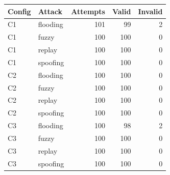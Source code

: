 \begin{tabular}{llrrr}
Config & Attack & Attempts & Valid & Invalid \\ 
\hline
C1 & flooding & 101 & 99 & 2 \\
C1 & fuzzy & 100 & 100 & 0 \\
C1 & replay & 100 & 100 & 0 \\
C1 & spoofing & 100 & 100 & 0 \\
C2 & flooding & 100 & 100 & 0 \\
C2 & fuzzy & 100 & 100 & 0 \\
C2 & replay & 100 & 100 & 0 \\
C2 & spoofing & 100 & 100 & 0 \\
C3 & flooding & 100 & 98 & 2 \\
C3 & fuzzy & 100 & 100 & 0 \\
C3 & replay & 100 & 100 & 0 \\
C3 & spoofing & 100 & 100 & 0 \\
\end{tabular}
